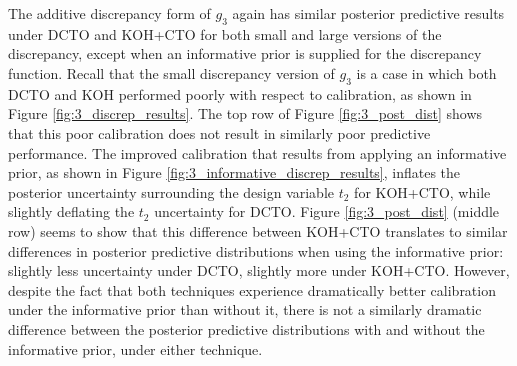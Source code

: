 \documentclass[12pt]{article}
\begin{document}
The additive discrepancy form of $g_3$ again has similar posterior predictive results under DCTO and KOH+CTO for both small and large versions of the discrepancy, except when an informative prior is supplied for the discrepancy function.
%
Recall that the small discrepancy version of $g_3$ is a case in which both DCTO and KOH performed poorly with respect to calibration, as shown in Figure \ref{fig:3_discrep_results}.
%
The top row of Figure \ref{fig:3_post_dist} shows that this poor calibration does not result in similarly poor predictive performance.
%
The improved calibration that results from applying an informative prior, as shown in Figure \ref{fig:3_informative_discrep_results}, inflates the posterior uncertainty surrounding the design variable $t_2$ for KOH+CTO, while slightly deflating the $t_2$ uncertainty for DCTO.
%
Figure \ref{fig:3_post_dist} (middle row) seems to show that this difference between KOH+CTO translates to similar differences in posterior predictive distributions when using the informative prior: slightly less uncertainty under DCTO, slightly more under KOH+CTO.
%
However, despite the fact that both techniques experience dramatically better calibration under the informative prior than without it, there is not a similarly dramatic difference between the posterior predictive distributions with and without the informative prior, under either technique.
%
\end{document}
